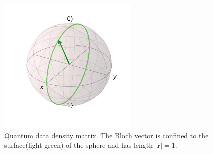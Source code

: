 \begin{figure}[htb!]
    \centering
    \includegraphics[width=0.6\textwidth]{figures/chapter3/bloch_sphere_2b.pdf}
    \caption{Quantum data density matrix. The Bloch vector is confined to the surface(light green) of the sphere and has length $|\mathbf{r}|=1$.}
    \label{fig:classic_bloch2}
\end{figure}

